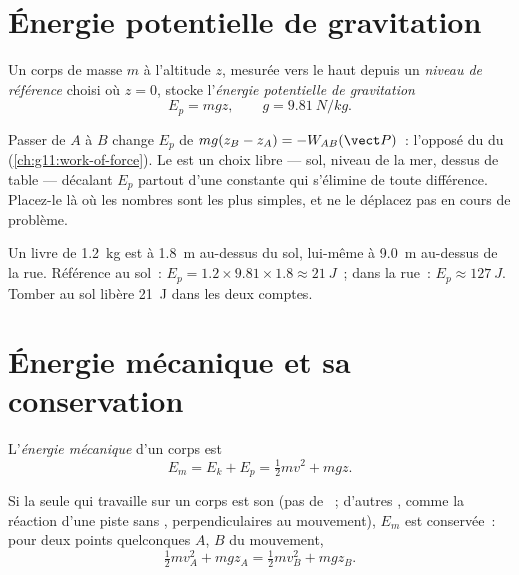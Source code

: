 \section{Énergie potentielle de gravitation}

\begin{definition}\label{def:g11:mechanical-energy:potential}
Un corps de masse $m$ à l'altitude $z$, mesurée vers le haut depuis un
\emph{niveau de référence} choisi où
$z = 0$, stocke l'\emph{énergie potentielle de
gravitation}
\[
E_p = m g z, \qquad g = \qty{9.81}{N/kg}.
\]
\end{definition}

\begin{remark}\label{rem:g11:mechanical-energy:reference}
Passer de $A$ à $B$ change $E_p$ de $mg(z_B - z_A) =
-W_{AB}(\vect P)$~: l'opposé du  du
(\cref{ch:g11:work-of-force}). Le
 est un choix
libre --- sol, niveau de la mer, dessus de table --- décalant $E_p$
partout d'une constante qui s'élimine de toute différence. Placez-le là
où les nombres sont les plus simples, et ne le déplacez pas en cours de
problème.
\end{remark}

\begin{example}\label{ex:g11:mechanical-energy:shelf}
Un livre de \qty{1.2}{kg} est à \qty{1.8}{m} au-dessus du sol, lui-même
à \qty{9.0}{m} au-dessus de la rue. Référence au sol~:
$E_p = 1.2 \times 9.81 \times 1.8 \approx \qty{21}{J}$~; dans la
rue~: $E_p \approx \qty{127}{J}$. Tomber au sol libère \qty{21}{J}
dans les deux comptes.
\end{example}

\section{Énergie mécanique et sa conservation}

\begin{definition}\label{def:g11:mechanical-energy:em}
L'\emph{énergie mécanique} d'un corps est
\[
E_m = E_k + E_p = \tfrac12 m v^2 + m g z .
\]
\end{definition}

\begin{theorem}\label{thm:g11:mechanical-energy:conservation}
Si la seule  qui travaille sur un corps
est son  (pas de
~; d'autres
, comme la réaction d'une piste
sans , perpendiculaires au mouvement), $E_m$ est
conservée~: pour deux points quelconques $A$, $B$ du mouvement,
\[
\tfrac12 m v_A^2 + m g z_A = \tfrac12 m v_B^2 + m g z_B .
\]
\end{theorem}

